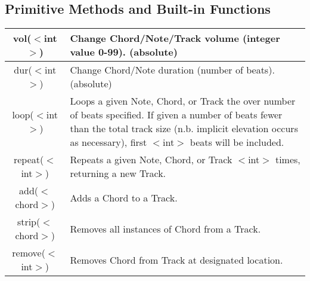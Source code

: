 \documentclass[letterpaper]{article}
\begin{document}
\begin{samepage}
\subsection{Primitive Methods and Built-in Functions}
\begin{table}[H]
\centering
\begin{tabularx}{.75\textwidth}{|c|X|}
\hline
vol($<$int$>$) & Change Chord/Note/Track volume (integer value 0-99). (absolute) \\
\hline
dur($<$int$>$) & Change Chord/Note duration (number of beats). (absolute) \\
\hline
loop($<$int$>$) & Loops a given Note, Chord, or Track the over number of beats specified. If given a number of beats fewer than the total track size (n.b. implicit elevation occurs as necessary), first $<$int$>$ beats will be included. \\
\hline
repeat($<$int$>$) & Repeats a given Note, Chord, or Track $<$int$>$ times, returning a new Track. \\
\hline
add($<$chord$>$) & Adds a Chord to a Track. \\
\hline
strip($<$chord$>$) & Removes all instances of Chord from a Track. \\
\hline
remove($<$int$>$) & Removes Chord from Track at designated location. \\
\hline
\end{tabularx}
\end{table}
\end{samepage}
\end{document}
